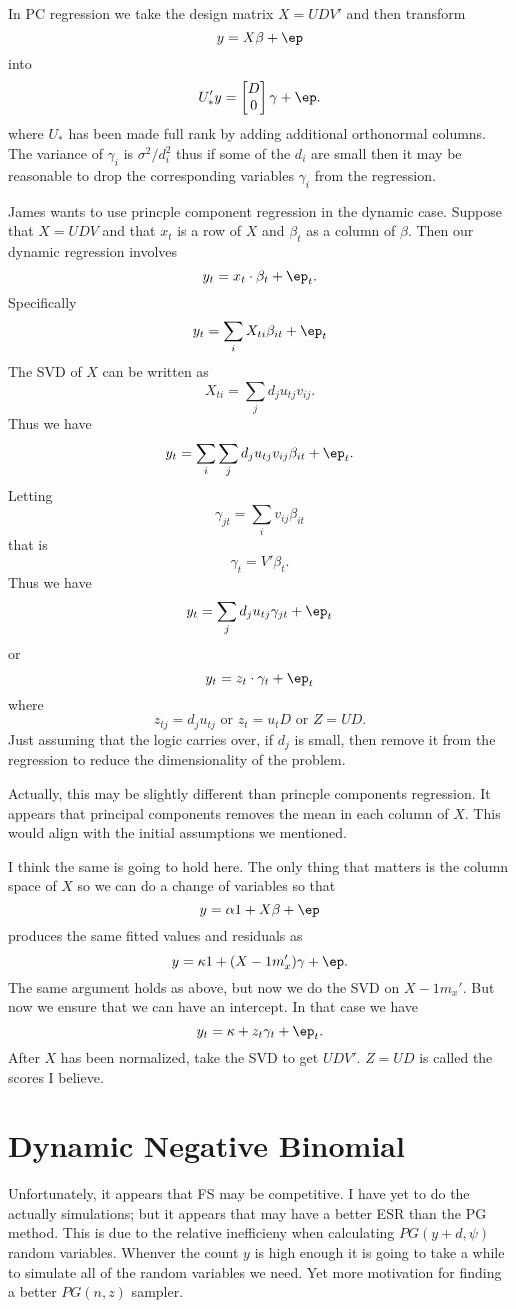 \documentclass{article}
\begin{document}
In PC regression we take the design matrix $X = U D V'$ and then transform
\[
y = X \beta + \ep
\]
into
\[
U_*' y = 
\begin{bmatrix}
D \\ 0
\end{bmatrix}
\gamma + \ep.
\]
where $U_*$ has been made full rank by adding additional orthonormal columns.
The variance of $\gamma_i$ is $\sigma^2 / d_i^2$ thus if some of the $d_i$ are
small then it may be reasonable to drop the corresponding variables $\gamma_i$
from the regression.

James wants to use princple component regression in the dynamic case.  Suppose
that $X = UDV$ and that $x_t$ is a row of $X$ and $\beta_t$ as a column of
$\beta$.  Then our dynamic regression involves
\[
y_t = x_t \cdot \beta_t + \ep_t.
\]
Specifically
\[
y_t = \sum_{i} X_{ti} \beta_{it} + \ep_t
\]
The SVD of $X$ can be written as
\[
X_{ti} = \sum_{j} d_j u_{tj} v_{ij}.
\]
Thus we have
\[
y_t = \sum_i \sum_j d_j u_{tj} v_{ij} \beta_{it} + \ep_t.
\]
Letting
\[
\gamma_{jt} = \sum_i v_{ij} \beta_{it}
\]
that is
\[
\gamma_t = V' \beta_t.
\]
Thus we have
\[
y_t = \sum_{j} d_j u_{tj} \gamma_{jt} + \ep_t
\]
or
\[
y_t = z_t \cdot \gamma_t + \ep_t
\]
where
\[
z_{tj} = d_j u_{tj} \text{ or } z_t = u_t D \text{ or } Z = UD.
\]
Just assuming that the logic carries over, if $d_j$ is small, then remove it
from the regression to reduce the dimensionality of the problem.

Actually, this may be slightly different than princple components regression.
It appears that principal components removes the mean in each column of $X$.
This would align with the initial assumptions we mentioned.

I think the same is going to hold here.  The only thing that matters is the
column space of $X$ so we can do a change of variables so that
\[
y = \alpha 1 + X \beta + \ep
\]
produces the same fitted values and residuals as
\[
y = \kappa 1 + (X - 1 m_x') \gamma + \ep.
\]
The same argument holds as above, but now we do the SVD on $X- 1 m_x'$.  But now
we ensure that we can have an intercept.  In that case we have
\[
y_t = \kappa + z_t \gamma_t + \ep_t.
\]
After $X$ has been normalized, take the SVD to get $UDV'$.  $Z=UD$ is called the
scores I believe.

\section{Dynamic Negative Binomial}

Unfortunately, it appears that FS may be competitive.  I have yet to do the
actually simulations; but it appears that \cite{fruhwirth-schnatter-etal-2009}
may have a better ESR than the PG method.  This is due to the relative
inefficieny when calculating $PG(y+d, \psi)$ random variables.  Whenver the
count $y$ is high enough it is going to take a while to simulate all of the
random variables we need.  Yet more motivation for finding a better $PG(n, z)$
sampler.
\end{document}
